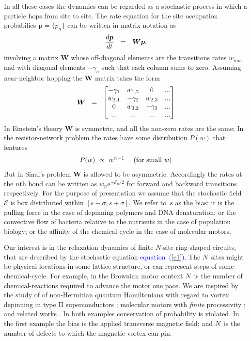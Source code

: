 \documentclass[aps,pre,floats,floatfix,twocolumn]{revtex4}
\newcommand{\amatrix}[1]{\begin{matrix} #1 \end{matrix}}
\newcommand{\eexp}[1]{\mathrm{e}^{#1}}
\newcommand{\be}[1]{\begin{eqnarray}\ifthenelse{#1=-1}{\nonumber}{\ifthenelse{#1=0}{}{\label{e#1}}}}
\newcommand{\eeq}{\end{eqnarray}}
\newcommand{\Eq}[1]{\textcolor{blue}{{equation}\!~(\ref{#1})}}
\newcommand{\rmrk}[1]{{\color[rgb]{0.6,0,0.1} #1}}
\begin{document}
%
In all these cases the dynamics can be regarded as a stochastic process 
in which a particle hops from site to site.
The rate equation \rmrk{for the site occupation probabilies $\bm{p}  = \{p_n\}$} can be written in matrix notation as 
%
\be{1}
\frac{d\bm{p}}{dt} \ \ = \ \ \bm{W} \bm{p}, 
\eeq
%
involving a matrix ${\bm{W}}$ whose off-diagonal elements 
are the transitions rates ${w_{nm}}$, 
and with diagonal elements ${-\gamma_n}$ such that each column sums to zero.
Assuming near-neighbor hopping the ${\bm{W}}$ matrix takes the form
%
\be{2}
\bm{W} \ \ = \ \ \left[\amatrix{
-\gamma_1   & w_{1,2}   & 0         & ... \\ 
w_{2,1}     & -\gamma_2 & w_{2,3}   & ... \\ 
0           & w_{3,2}   & -\gamma_3 & ... \\
...         & ...       & ...       & ...
}\right]
\eeq 
%
In Einstein's theory $\bm{W}$ is symmetric, 
and all the non-zero rates are the same; 
In the resistor-network problem the rates
have some distribution $P(w)$ that features \cite{Alexander}
%
\be{4}
P(w) \ \propto \ w^{\alpha-1} \ \ \ \ \text{(for small $w$)}
\eeq
%
But in Sinai's problem $\bm{W}$ is allowed to be asymmetric.
Accordingly the rates at the $n$th bond can be written 
as $w_n\eexp{\pm\mathcal{E}_n/2}$ 
for forward  and backward transitions respectively. 
For the purpose of presentation we assume that the stochastic field~$\mathcal{E}$  
is box distributed within ${[s-\sigma,s+\sigma]}$.
We refer to~$s$ as the bias:  
it is the pulling force in the case of depinning polymers and DNA denaturation; 
or the convective flow of bacteria relative to the nutrients in the case of population biology; 
or the affinity of the chemical cycle in the case of molecular motors.

Our interest is in the relaxation dynamics 
of finite $N$-site ring-shaped circuits, 
that are described by the stochastic equation \Eq{e1}.
The $N$~sites might be physical locations in some lattice 
structure, or can represent steps of some chemical-cycle. 
For example, in the Brownian motor context $N$~is the number 
of chemical-reactions required to advance the motor one pace. 
%
We are inspired by the study of of non-Hermitian quantum Hamiltonians 
with regard to vortex depinning in type II superconductors \cite{Hatano1,Hatano2,Shnerb1};   
molecular motors with {\em finite} processivity \cite{brm1,brm2}; 
and related works \cite{Brouwer,Goldsheid,Zee}.
In both examples \rmrk{conservation of probability} is violated.  
In the first example the bias is the applied transverse magnetic field;  
and $N$~is the number of defects to which the magnetic vortex can pin.
\end{document}
